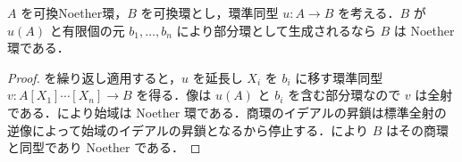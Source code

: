 \begin{prop}[有限生成可換代数のNoether性]
$A$ を可換Noether環，$B$ を可換環とし，環準同型 $u:A\to B$ を考える．$B$ が $u(A)$ と有限個の元 $b_1,\ldots,b_n$ により部分環として生成されるなら $B$ は Noether 環である．
\end{prop}
\begin{proof}
を繰り返し適用すると，$u$ を延長し $X_i$ を $b_i$ に移す環準同型 $v:A[X_1]\cdots[X_n]\to B$ を得る．像は $u(A)$ と $b_i$ を含む部分環なので $v$ は全射である．により始域は Noether 環である．商環のイデアルの昇鎖は標準全射の逆像によって始域のイデアルの昇鎖となるから停止する．により $B$ はその商環と同型であり Noether である．
\end{proof}
